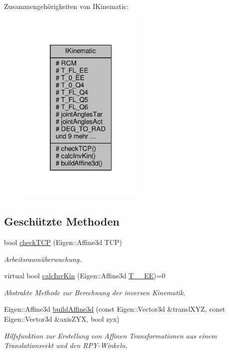 Zusammengehörigkeiten von I\-Kinematic\-:
\nopagebreak
\begin{figure}[H]
\begin{center}
\leavevmode
\includegraphics[width=172pt]{classIKinematic__coll__graph}
\end{center}
\end{figure}
\subsection*{Geschützte Methoden}
\begin{DoxyCompactItemize}
\item 
bool \hyperlink{classIKinematic_a2c740366fa7cca713fb0962a6be7e9f0}{check\-T\-C\-P} (Eigen\-::\-Affine3d T\-C\-P)
\begin{DoxyCompactList}\small\item\em Arbeitsraumüberwachung. \end{DoxyCompactList}\item 
virtual bool \hyperlink{classIKinematic_a6f95d80c4330253643c49a758404e4a7}{calc\-Inv\-Kin} (Eigen\-::\-Affine3d \hyperlink{classIKinematic_a1c0a95317992b7fcaf26ab2bf9aaf3de}{T\-\_\-\_\-\-E\-E})=0
\begin{DoxyCompactList}\small\item\em Abstrakte Methode zur Berechnung der inversen Kinematik. \end{DoxyCompactList}\item 
Eigen\-::\-Affine3d \hyperlink{classIKinematic_af2065ef145ec1f796e5e34b123f4dd46}{build\-Affine3d} (const Eigen\-::\-Vector3d \&transl\-X\-Y\-Z, const Eigen\-::\-Vector3d \&axis\-Z\-Y\-X, bool zyx)
\begin{DoxyCompactList}\small\item\em Hilfsfunktion zur Erstellung von Affinen Transformationen aus einem Translationsvekt und den R\-P\-Y-\/\-Winkeln. \end{DoxyCompactList}\end{DoxyCompactItemize}
